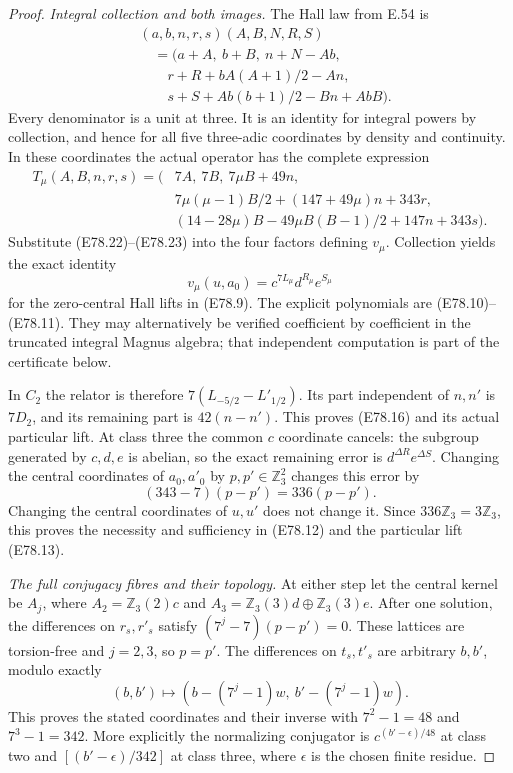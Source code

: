 \begin{proof}
\emph{Integral collection and both images.}
The Hall law from E.54 is
\[
 \begin{aligned}
 &(a,b,n,r,s)(A,B,N,R,S)\\
 &\quad=\bigl(a+A,\ b+B,\ n+N-Ab,\\
 &\qquad r+R+bA(A+1)/2-An,\\
 &\qquad s+S+Ab(b+1)/2-Bn+AbB\bigr).
 \end{aligned}
 \tag{E78.22}
\]
Every denominator is a unit at three. It is an
identity for integral powers by collection,
and hence for all five three-adic coordinates
by density and continuity. In these coordinates
the actual operator has the complete expression
\[
 \begin{aligned}
 T_\mu(A,B,n,r,s)=\bigl(&7A,\ 7B,\ 7\mu B+49n,\\
 &7\mu(\mu-1)B/2+(147+49\mu)n+343r,\\
 &(14-28\mu)B-49\mu B(B-1)/2+147n+343s\bigr).
 \end{aligned}
 \tag{E78.23}
\]
Substitute (E78.22)--(E78.23) into the four
factors defining $v_\mu$. Collection yields
the exact identity
\[
        v_\mu(u,a_0)=c^{7L_\mu}d^{R_\mu}e^{S_\mu}
 \tag{E78.24}
\]
for the zero-central Hall lifts in (E78.9).
The explicit polynomials are (E78.10)--(E78.11).
They may alternatively be verified coefficient
by coefficient in the truncated integral
Magnus algebra; that independent computation
is part of the certificate below.

In $C_2$ the relator is therefore
$7(L_{-5/2}-L'_{1/2})$.
Its part independent of $n,n'$ is $7D_2$,
and its remaining part is $42(n-n')$.
This proves (E78.16) and its actual particular
lift. At class three the common $c$ coordinate
cancels: the subgroup generated by $c,d,e$
is abelian, so the exact remaining error is
$d^{\Delta R}e^{\Delta S}$.
Changing the central coordinates of $a_0,a'_0$
by $p,p'\in\mathbb Z_3^2$ changes this error by
\[
                   (343-7)(p-p')=336(p-p').
 \tag{E78.25}
\]
Changing the central coordinates of $u,u'$
does not change it. Since
$336\mathbb Z_3=3\mathbb Z_3$, this proves
the necessity and sufficiency in (E78.12)
and the particular lift (E78.13).

\emph{The full conjugacy fibres and their topology.}
At either step let the central kernel be $A_j$,
where $A_2=\mathbb Z_3(2)c$ and
$A_3=\mathbb Z_3(3)d\oplus\mathbb Z_3(3)e$.
After one solution, the differences on
$r_s,r'_s$ satisfy
$(7^j-7)(p-p')=0$. These lattices are
torsion-free and $j=2,3$, so $p=p'$.
The differences on $t_s,t'_s$ are arbitrary
$b,b'$, modulo exactly
\[
       (b,b')\longmapsto
             (b-(7^j-1)w,\ b'-(7^j-1)w).
 \tag{E78.26}
\]
This proves the stated coordinates and their
inverse with $7^2-1=48$ and $7^3-1=342$.
More explicitly the normalizing conjugator is
$c^{(b'-\epsilon)/48}$ at class two and
$[(b'-\epsilon)/342]$ at class three, where
$\epsilon$ is the chosen finite residue.


\end{proof}
